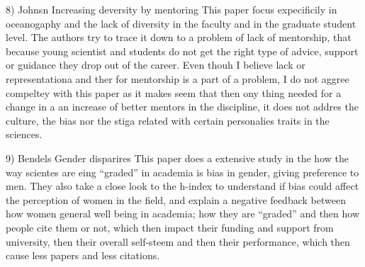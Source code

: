 \documentclass{tufte-handout}
\begin{document}
8) Johnsn Increasing deversity by mentoring    
This paper focus expecificily in oceanogaphy and the lack of diversity in  the faculty and in the graduate student level. The authors try to trace it down to a problem of lack of mentorship, that because young scientist and students do not get the right type of advice, support or guidance  they drop out of the career. Even thouh I believe lack or representationa and ther for mentorship is a part of a problem, I do not aggree compeltey with this paper as it makes seem that then ony thing needed for a change in a an increase of better mentors in the discipline, it does not addres the culture, the bias nor the stiga related with certain personalies traits in the sciences.

9) Bendels Gender disparires
This paper does a extensive study in the how the way scientes are eing “graded” in academia is bias in gender, giving preference to men. They also take a close look to the h-index to understand if bias could affect the perception of women in the field, and explain a negative feedback between how women general well being in academia; how they are “graded” and then how people cite them or not, which then impact their funding and support from university, then their overall self-steem and then their performance, which then cause less papers and less citations. 



\end{document}
